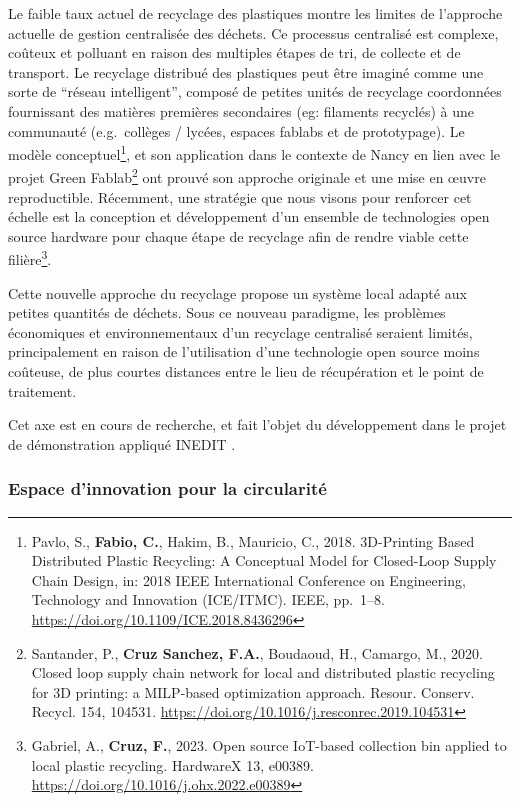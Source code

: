 \documentclass[
  11pt,
]{article}
\begin{document}
Le faible taux actuel de recyclage des plastiques montre les limites de
l'approche actuelle de gestion centralisée des déchets. Ce processus
centralisé est complexe, coûteux et polluant en raison des multiples
étapes de tri, de collecte et de transport. Le recyclage distribué des
plastiques peut être imaginé comme une sorte de ``réseau intelligent'',
composé de petites unités de recyclage coordonnées fournissant des
matières premières secondaires (eg: filaments recyclés) à une communauté
(e.g.~collèges / lycées, espaces fablabs et de prototypage). Le modèle
conceptuel\footnote{Pavlo, S., \textbf{Fabio, C.}, Hakim, B., Mauricio,
  C., 2018. 3D-Printing Based Distributed Plastic Recycling: A
  Conceptual Model for Closed-Loop Supply Chain Design, in: 2018 IEEE
  International Conference on Engineering, Technology and Innovation
  (ICE/ITMC). IEEE, pp.~1--8.
  \url{https://doi.org/10.1109/ICE.2018.8436296}}, et son application
dans le contexte de Nancy en lien avec le projet Green Fablab\footnote{Santander,
  P., \textbf{Cruz Sanchez, F.A.}, Boudaoud, H., Camargo, M., 2020.
  Closed loop supply chain network for local and distributed plastic
  recycling for 3D printing: a MILP-based optimization approach. Resour.
  Conserv. Recycl. 154, 104531.
  \url{https://doi.org/10.1016/j.resconrec.2019.104531}} ont prouvé son
approche originale et une mise en œuvre reproductible. Récemment, une
stratégie que nous visons pour renforcer cet échelle est la conception
et développement d'un ensemble de technologies open source hardware pour
chaque étape de recyclage afin de rendre viable cette
filière\footnote{Gabriel, A., \textbf{Cruz, F.}, 2023. Open source
  IoT-based collection bin applied to local plastic recycling. HardwareX
  13, e00389. \url{https://doi.org/10.1016/j.ohx.2022.e00389}}.

Cette nouvelle approche du recyclage propose un système local adapté aux
petites quantités de déchets. Sous ce nouveau paradigme, les problèmes
économiques et environnementaux d'un recyclage centralisé seraient
limités, principalement en raison de l'utilisation d'une technologie
open source moins coûteuse, de plus courtes distances entre le lieu de
récupération et le point de traitement.

Cet axe est en cours de recherche, et fait l'objet du développement dans
le projet de démonstration appliqué INEDIT .

\hypertarget{espace-dinnovation-pour-la-circularituxe9}{%
\subsubsection{Espace d'innovation pour la
circularité}\label{espace-dinnovation-pour-la-circularituxe9}}
\end{document}
